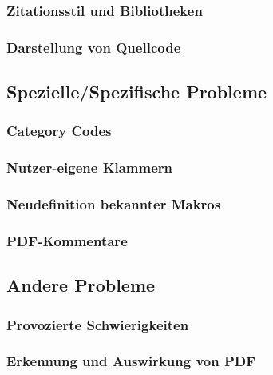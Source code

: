 \subsubsection{Zitationsstil und Bibliotheken}%
\subsubsection{Darstellung von Quellcode}%




\subsection{Spezielle/Spezifische Probleme}

\subsubsection{Category Codes}
\subsubsection{Nutzer-eigene Klammern}
\subsubsection{Neudefinition bekannter Makros}%
\subsubsection{PDF-Kommentare}%

\subsection{Andere Probleme}
\subsubsection{Provozierte Schwierigkeiten}
\subsubsection{Erkennung und Auswirkung von PDF}\label{subsubsec:problems:pdfinclusion}